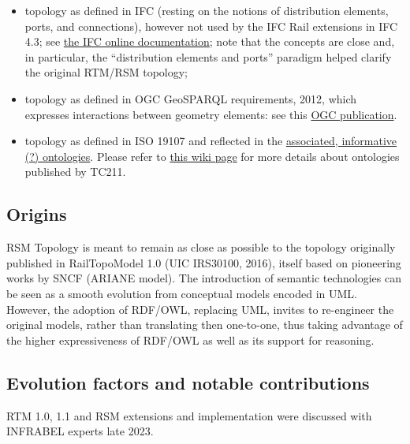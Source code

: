 \documentclass[
  11pt,
]{article}
\providecommand{\tightlist}{%
  \setlength{\itemsep}{0pt}\setlength{\parskip}{0pt}}
\begin{document}
\begin{itemize}
\tightlist
\item
  topology as defined in IFC (resting on the notions of distribution
  elements, ports, and connections), however not used by the IFC Rail
  extensions in IFC 4.3; see
  \href{https://ifc43-docs.standards.buildingsmart.org/IFC/RELEASE/IFC4x3/HTML/lexical/IfcDistributionElement.htm}{the
  IFC online documentation}; note that the concepts are close and, in
  particular, the ``distribution elements and ports'' paradigm helped
  clarify the original RTM/RSM topology;
\item
  topology as defined in OGC GeoSPARQL requirements, 2012, which
  expresses interactions between geometry elements: see this
  \href{https://www.ogc.org/standard/geosparql/}{OGC publication}.
\item
  topology as defined in ISO 19107 and reflected in the
  \href{https://github.com/ISO-TC211/ontologies/tree/main/iso19107/2003}{associated,
  informative (?) ontologies}. Please refer to
  \href{https://github.com/UICrail/SemanticRSM/wiki/Geographic-information-in-OWL-(and-UML)}{this
  wiki page} for more details about ontologies published by TC211.
\end{itemize}

\hypertarget{origins}{%
\subsection{Origins}\label{origins}}

RSM Topology is meant to remain as close as possible to the topology
originally published in RailTopoModel 1.0 (UIC IRS30100, 2016), itself
based on pioneering works by SNCF (ARIANE model). The introduction of
semantic technologies can be seen as a smooth evolution from conceptual
models encoded in UML. However, the adoption of RDF/OWL, replacing UML,
invites to re-engineer the original models, rather than translating then
one-to-one, thus taking advantage of the higher expressiveness of
RDF/OWL as well as its support for reasoning.

\hypertarget{evolution-factors-and-notable-contributions}{%
\subsection{Evolution factors and notable
contributions}\label{evolution-factors-and-notable-contributions}}

RTM 1.0, 1.1 and RSM extensions and implementation were discussed with
INFRABEL experts late 2023.
\end{document}
